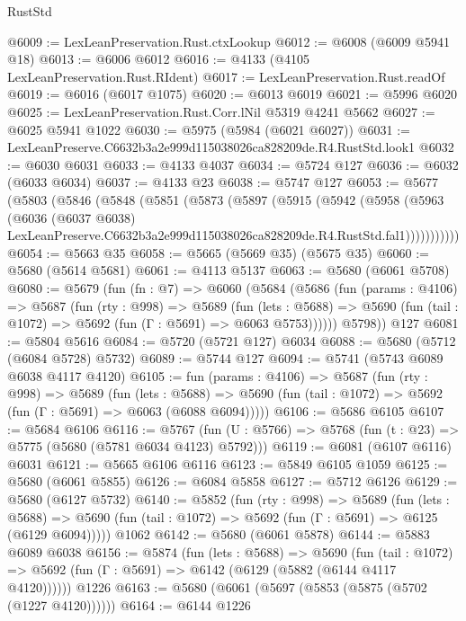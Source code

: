 \begin{lexlean}{RustStd}
\begin{coremodule}
@6009 := LexLeanPreservation.Rust.ctxLookup
@6012 := @6008 (@6009 @5941 @18)
@6013 := @6006 @6012
@6016 := @4133 (@4105 LexLeanPreservation.Rust.RIdent)
@6017 := LexLeanPreservation.Rust.readOf
@6019 := @6016 (@6017 @1075)
@6020 := @6013 @6019
@6021 := @5996 @6020
@6025 := LexLeanPreservation.Rust.Corr.lNil @5319 @4241 @5662
@6027 := @6025 @5941 @1022
@6030 := @5975 (@5984 (@6021 @6027))
@6031 := LexLeanPreserve.C6632b3a2e999d115038026ca828209de.R4.RustStd.look1
@6032 := @6030 @6031
@6033 := @4133 @4037
@6034 := @5724 @127
@6036 := @6032 (@6033 @6034)
@6037 := @4133 @23
@6038 := @5747 @127
@6053 := @5677
    (@5803
      (@5846
        (@5848
          (@5851
            (@5873
              (@5897
                (@5915
                  (@5942
                    (@5958
                      (@5963
                        (@6036
                          (@6037 @6038)
                          LexLeanPreserve.C6632b3a2e999d115038026ca828209de.R4.RustStd.fal1)))))))))))
@6054 := @5663 @35
@6058 := @5665 (@5669 @35) (@5675 @35)
@6060 := @5680 (@5614 @5681)
@6061 := @4113 @5137
@6063 := @5680 (@6061 @5708)
@6080 := @5679
    (fun (fn : @7) =>
    @6060
      (@5684
        (@5686
          (fun (params : @4106) =>
          @5687
            (fun (rty : @998) =>
            @5689
              (fun (lets : @5688) =>
              @5690 (fun (tail : @1072) => @5692 (fun (Γ : @5691) => @6063 @5753))))))
        @5798))
    @127
@6081 := @5804 @5616
@6084 := @5720 (@5721 @127) @6034
@6088 := @5680 (@5712 (@6084 @5728) @5732)
@6089 := @5744 @127
@6094 := @5741 (@5743 @6089 @6038 @4117 @4120)
@6105 := fun (params : @4106) =>
  @5687
    (fun (rty : @998) =>
    @5689
      (fun (lets : @5688) =>
      @5690 (fun (tail : @1072) => @5692 (fun (Γ : @5691) => @6063 (@6088 @6094)))))
@6106 := @5686 @6105
@6107 := @5684 @6106
@6116 := @5767 (fun (U : @5766) => @5768 (fun (t : @23) => @5775 (@5680 (@5781 @6034 @4123) @5792)))
@6119 := @6081 (@6107 @6116) @6031
@6121 := @5665 @6106 @6116
@6123 := @5849 @6105 @1059
@6125 := @5680 (@6061 @5855)
@6126 := @6084 @5858
@6127 := @5712 @6126
@6129 := @5680 (@6127 @5732)
@6140 := @5852
    (fun (rty : @998) =>
    @5689
      (fun (lets : @5688) =>
      @5690 (fun (tail : @1072) => @5692 (fun (Γ : @5691) => @6125 (@6129 @6094)))))
    @1062
@6142 := @5680 (@6061 @5878)
@6144 := @5883 @6089 @6038
@6156 := @5874
    (fun (lets : @5688) =>
    @5690
      (fun (tail : @1072) => @5692 (fun (Γ : @5691) => @6142 (@6129 (@5882 (@6144 @4117 @4120))))))
    @1226
@6163 := @5680 (@6061 (@5697 (@5853 (@5875 (@5702 (@1227 @4120))))))
@6164 := @6144 @1226

\end{coremodule}
\end{lexlean}
